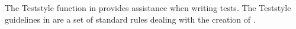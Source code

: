 The Teststyle function in \app{} provides assistance when writing tests. The Teststyle guidelines in \app{} are a set of standard rules dealing with the creation of \gdsuites{}. 


